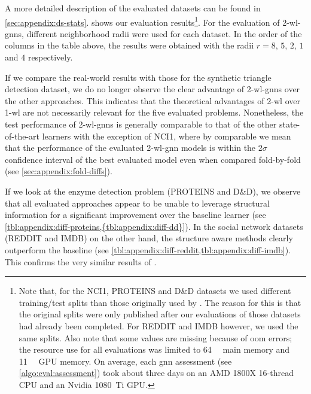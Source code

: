 A more detailed description of the evaluated datasets can be found in \cref{sec:appendix:ds-stats}.
 shows our evaluation results\footnote{
	Note that, for the NCI1, PROTEINS and D\&D datasets we used different training/test splits than those originally used by \citet{Errica2020}.
	The reason for this is that the original splits were only published after our evaluations of those datasets had already been completed.
	For REDDIT and IMDB however, we used the same splits.
	Also note that some values are missing because of \acf{oom} errors;
	the resource use for all evaluations was limited to \SI{64}{\giga\byte} main memory and \SI{11}{\giga\byte} GPU memory.
	On average, each \ac{gnn} assessment (see \cref{algo:eval:assessment}) took about three days on an AMD 1800X 16-thread CPU and an Nvidia 1080~Ti GPU.%
}.
For the evaluation of 2-\acs{wl}-\acsp{gnn}, different neighborhood radii were used for each dataset.
In the order of the columns in the table above, the results were obtained with the radii $r = 8$, $5$, $2$, $1$ and $4$ respectively.

If we compare the real-world results with those for the synthetic triangle detection dataset, we do no longer observe the clear advantage of 2-\acs{wl}-\acsp{gnn} over the other approaches.
This indicates that the theoretical advantages of 2-\acs{wl} over 1-\acs{wl} are not necessarily relevant for the five evaluated problems.
Nonetheless, the test performance of 2-\acs{wl}-\acsp{gnn} is generally comparable to that of the other state-of-the-art learners with the exception of NCI1,
where by comparable we mean that the performance of the evaluated 2-\acs{wl}-\acs{gnn} models is within the $2\sigma$ confidence interval of the best evaluated model even when compared fold-by-fold (see \cref{sec:appendix:fold-diffs}).

If we look at the enzyme detection problem (PROTEINS and D\&D), we observe that all evaluated approaches appear to be unable to leverage structural information for a significant improvement over the baseline learner (see \cref{tbl:appendix:diff-proteins,{tbl:appendix:diff-dd}}).
In the social network datasets (REDDIT and IMDB) on the other hand, the structure aware methods clearly outperform the baseline (see \cref{tbl:appendix:diff-reddit,tbl:appendix:diff-imdb}).
This confirms the very similar results of \citet{Errica2020}.

